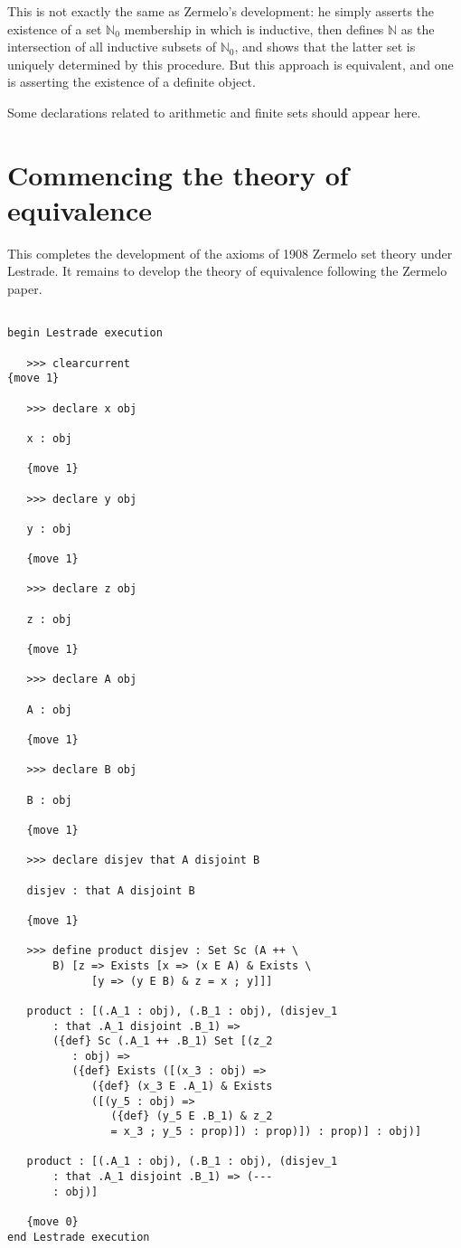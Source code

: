 \documentclass[12pt]{article}
\begin{document}
This is not exactly the same as Zermelo's development:  he simply asserts the existence of a set ${\mathbb N}_0$ membership in which is inductive, then defines
$\mathbb N$ as the intersection of all inductive subsets of ${\mathbb N}_0$, and shows that the latter set is uniquely determined by this procedure.  But this approach is
equivalent, and one is asserting the existence of a definite object.

Some declarations related to arithmetic and finite sets should appear here.

\section{Commencing the theory of equivalence}

This completes the development of the axioms of 1908 Zermelo set theory under Lestrade.  It remains to develop the theory of equivalence following the Zermelo paper.

\begin{verbatim}

begin Lestrade execution

   >>> clearcurrent
{move 1}

   >>> declare x obj

   x : obj

   {move 1}

   >>> declare y obj

   y : obj

   {move 1}

   >>> declare z obj

   z : obj

   {move 1}

   >>> declare A obj

   A : obj

   {move 1}

   >>> declare B obj

   B : obj

   {move 1}

   >>> declare disjev that A disjoint B

   disjev : that A disjoint B

   {move 1}

   >>> define product disjev : Set Sc (A ++ \
       B) [z => Exists [x => (x E A) & Exists \
             [y => (y E B) & z = x ; y]]]

   product : [(.A_1 : obj), (.B_1 : obj), (disjev_1 
       : that .A_1 disjoint .B_1) => 
       ({def} Sc (.A_1 ++ .B_1) Set [(z_2 
          : obj) => 
          ({def} Exists ([(x_3 : obj) => 
             ({def} (x_3 E .A_1) & Exists 
             ([(y_5 : obj) => 
                ({def} (y_5 E .B_1) & z_2 
                = x_3 ; y_5 : prop)]) : prop)]) : prop)] : obj)]

   product : [(.A_1 : obj), (.B_1 : obj), (disjev_1 
       : that .A_1 disjoint .B_1) => (--- 
       : obj)]

   {move 0}
end Lestrade execution
\end{verbatim}
\end{document}

